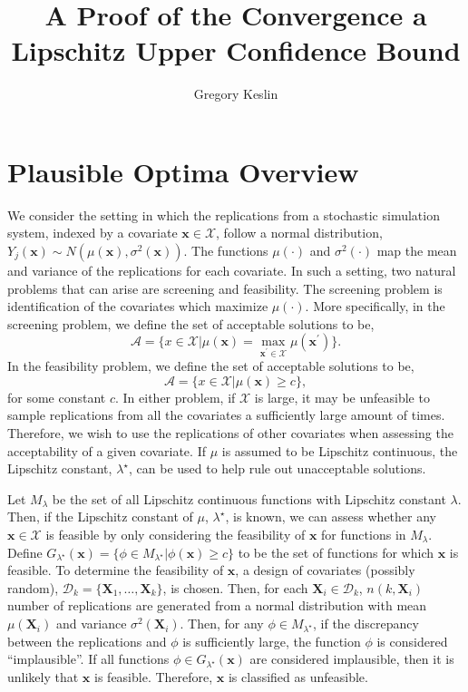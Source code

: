 \documentclass[12pt]{article}
\title{A Proof of the Convergence a Lipschitz Upper Confidence Bound}
\author{Gregory Keslin}
\date{}
\newcommand{\spa}[1]{\text{{$\mathcal{#1}$}}}
\newcommand{\vect}[1]{\ensuremath{\bm{#1}}}
\newcommand{\desCap}{\ensuremath{\bm{X}}}
\begin{document}
\maketitle



\section{Plausible Optima Overview}
We consider the setting in which the replications from a stochastic simulation system, indexed by a covariate $\vect{x} \in \spa{X}$, follow a normal distribution, $Y_j(\vect{x})\sim N(\mu(\vect{x}),\sigma^2(\vect{x}))$. The functions $\mu(\cdot)$ and $\sigma^2(\cdot)$ map the mean and variance of the replications for each covariate. In such a setting, two natural problems that can arise are screening and feasibility. The screening problem is identification of the covariates which maximize $\mu(\cdot)$. More specifically, in the screening problem, we define the set of acceptable solutions to be,
$$\mathcal{A}=\{x \in \spa{X}| \mu(\vect{x})=\max_{\vect{x}^\prime \in \spa{X}}\mu(\vect{x}^\prime)\}.$$
In the feasibility problem, we define the set of acceptable solutions to be,
$$\mathcal{A}=\{x \in \spa{X}|\mu(\vect{x})\geq c\},$$
for some constant $c$. In either problem, if $\spa{X}$ is large, it may be unfeasible to sample replications from all the covariates a sufficiently large amount of times. Therefore, we wish to use the replications of other covariates when assessing the acceptability of a given covariate. If $\mu$ is assumed to be Lipschitz continuous, the Lipschitz constant, $\lambda^\star$, can be used to help rule out unacceptable solutions.

Let $M_{\lambda}$ be the set of all Lipschitz continuous functions with Lipschitz constant $\lambda$. Then, if the Lipschitz constant of $\mu$, $\lambda^\star$, is known, we can assess whether any $\vect{x} \in \spa{X}$ is feasible by only considering the feasibility of $\vect{x}$ for functions in $M_{\lambda}$. Define $G_{\lambda^\star}(\vect{x})=\{\phi \in M_{\lambda^\star}|\phi(\vect{x})\geq c\}$ to be the set of functions for which $\vect{x}$ is feasible. To determine the feasibility of $\vect{x}$, a design of covariates (possibly random), $\mathcal{D}_k=\{\desCap_1,\ldots,\desCap_k\}$, is chosen. Then, for each $\desCap_i \in \mathcal{D}_k$, $n(k,\desCap_i)$ number of replications are generated from a normal distribution with mean $\mu(\desCap_i)$ and variance $\sigma^2(\desCap_i)$. Then, for any $\phi \in M_{\lambda^\star}$, if the discrepancy between the replications and $\phi$ is sufficiently large, the function $\phi$ is considered ``implausible''. If all functions $\phi \in G_{\lambda^\star}(\vect{x})$ are considered implausible, then it is unlikely that $\vect{x}$ is feasible. Therefore, $\vect{x}$ is classified as unfeasible. 
\end{document}
